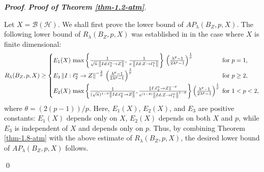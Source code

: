\documentclass[a4paper,11pt, reqno]{amsart}
\theoremstyle{definition}
\newenvironment{pf}[1][]{%
	\vskip 3mm
	\noindent
	\ifthenelse{\equal{#1}{}}%
	{{\slshape {\bf Proof}. }}%
	{{\slshape #1.} }%
}%
{\qed\bigskip}
\newcommand{\norm}[1]{\left\lVert#1\right\rVert}
\begin{document}
\begin{pf}[{\bf Proof of Theorem \ref{thm-1.2-atm}}]
Let $X=\mathcal{B}(\mathcal{H})$. We shall first prove the lower bound of $AP_{\lambda}(B_{Z}, p,X)$. The following lower bound of $R_{\lambda}(B_{Z}, p,X)$ was established in \cite[Theorem 1.2]{Himadri-local-Banach-1} in the case where $X$ is finite dimensional:
\begin{equation*}
	R_{\lambda}(B_{Z}, p,X) \geq	\begin{cases}
		E_{1}(X)\,  \max \left\{\frac{1}{\sqrt{n}\, \norm{Id: \ell^n_{2} \rightarrow Z}}, \, \frac{1}{e\, \norm{Id: Z \rightarrow \ell^n_{1}}}\right\}\, \left(\frac{\lambda^p -1}{2\lambda^p - 1}\right)^{\frac{1}{p}} & \text{for $p=1$}, \\[2mm]
		E_{3}\norm{I:\ell^n _2 \rightarrow Z}^{-\frac{2}{p}}\, \left(\frac{\lambda^p -1}{2\lambda^p - 1}\right)^{\frac{1}{p}}\, & \text{for $p \geq 2$}, \\[2mm]
		
		E_{2}(X)\,  \max \left\{\frac{1}{(\sqrt{n})^{1-\theta} \norm{Id: \ell^n_{2} \rightarrow Z}},  \frac{\norm{I:\ell^n _2 \rightarrow Z}^{-\theta}}{e^{(1-\theta)} \norm{Id: Z \rightarrow \ell^n_{1}}^{1-\theta}}\right\}\left(\frac{\lambda^p -1}{2\lambda^p - 1}\right)^{\frac{1}{p}} \hspace{-2mm} & \text{for $1<p< 2$}, 
	\end{cases}
\end{equation*}
where $\theta = (2(p-1))/p$. Here, $E_{1}(X)$, $E_{2}(X)$, and $E_{3}$ are positive constants: $E_{1}(X)$ depends only on $X$, $E_{2}(X)$ depends on both $X$ and $p$, while $E_{3}$ is independent of $X$ and depends only on $p$. Thus, by combining Theorem \ref{thm-1.8-atm} with the above estimate of $R_{\lambda}(B_{Z}, p,X)$, the desired lower bound of $AP_{\lambda}(B_{Z}, p,X)$ follows. 
\vspace{1mm}


\end{pf}
\end{document}
